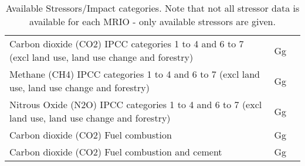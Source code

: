 \begin{table}
\begin{tabular}{ l l l }
Carbon dioxide (CO2) IPCC categories 1 to 4 and 6 to 7 (excl land use, land use change and forestry) & Gg             &                                                  \\
Methane (CH4) IPCC categories 1 to 4 and 6 to 7 (excl land use, land use change and forestry)        & Gg             &                                                  \\
Nitrous Oxide (N2O) IPCC categories 1 to 4 and 6 to 7 (excl land use, land use change and forestry)  & Gg             &                                                  \\
Carbon dioxide (CO2) Fuel combustion                                                                 & Gg             &                                                  \\
Carbon dioxide (CO2) Fuel combustion and cement                                                      & Gg             &                                                  \\
\end{tabular}

\caption{Available Stressors/Impact categories. Note that not all stressor data is available for each MRIO - only available stressors are given.}
\end{table}
  